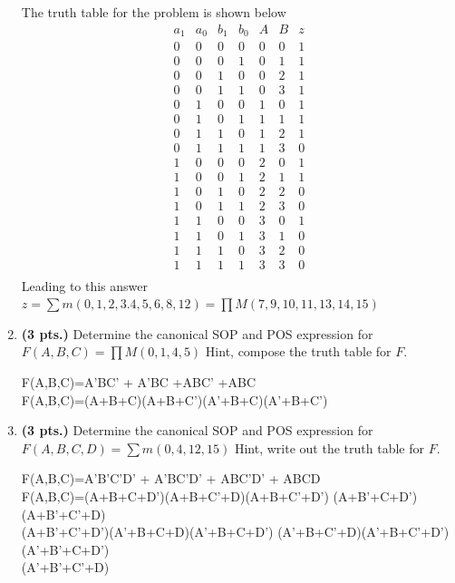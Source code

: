 \begin{enumerate}
\begin{solution}{
The truth table for the problem is shown below
$$\begin{array}{c|c|c|c||c|c||c}
a_1 & a_0 & b_1 & b_0 & A  & B & z  \\ \hline
0 & 0 & 0 & 0 & 0 & 0 & 1  \\ \hline
0 & 0 & 0 & 1 & 0 & 1 & 1  \\ \hline
0 & 0 & 1 & 0 & 0 & 2 & 1  \\ \hline
0 & 0 & 1 & 1 & 0 & 3 & 1  \\ \hline
0 & 1 & 0 & 0 & 1 & 0 & 1  \\ \hline
0 & 1 & 0 & 1 & 1 & 1 & 1  \\ \hline
0 & 1 & 1 & 0 & 1 & 2 & 1  \\ \hline
0 & 1 & 1 & 1 & 1 & 3 & 0  \\ \hline
1 & 0 & 0 & 0 & 2 & 0 & 1  \\ \hline
1 & 0 & 0 & 1 & 2 & 1 & 1  \\ \hline
1 & 0 & 1 & 0 & 2 & 2 & 0  \\ \hline
1 & 0 & 1 & 1 & 2 & 3 & 0  \\ \hline
1 & 1 & 0 & 0 & 3 & 0 & 1  \\ \hline
1 & 1 & 0 & 1 & 3 & 1 & 0  \\ \hline
1 & 1 & 1 & 0 & 3 & 2 & 0  \\ \hline
1 & 1 & 1 & 1 & 3 & 3 & 0  \\
\end{array}$$
Leading to this answer
$ z = \sum m(0,1,2,3.4,5,6,8,12) = \prod M(7,9,10,11,13,14,15)$
}\end{solution}

	

\item {\bf (3 pts.)} Determine the canonical SOP and POS expression for 
$F(A,B,C) = \prod M (0,1,4,5)$  Hint, compose the truth table for $F$.

\begin{solution}{
F(A,B,C)=A'BC' + A'BC +ABC' +ABC  \\
F(A,B,C)=(A+B+C)(A+B+C')(A'+B+C)(A'+B+C')
}\end{solution}

\item {\bf (3 pts.)} Determine the canonical SOP and POS expression for 
$F(A,B,C,D) = \sum m(0,4,12,15)$ Hint, write out the truth table for $F$.

\begin{solution}{
F(A,B,C)=A'B'C'D' + A'BC'D' + ABC'D' + ABCD  \\
F(A,B,C)=(A+B+C+D')(A+B+C'+D)(A+B+C'+D') (A+B'+C+D')(A+B'+C'+D) \\
(A+B'+C'+D')(A'+B+C+D)(A'+B+C+D') (A'+B+C'+D)(A'+B+C'+D')(A'+B'+C+D')\\
(A'+B'+C'+D)
}\end{solution}


\end{enumerate}
